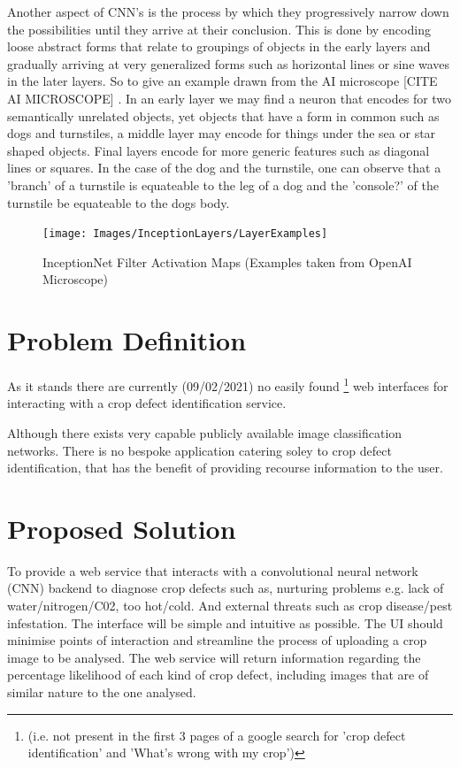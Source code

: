   \par
  Another aspect of CNN's is the process by which they progressively narrow down the possibilities until they arrive at their conclusion. This is done by encoding loose abstract forms that relate to groupings of objects in the early layers and gradually arriving at very generalized forms such as horizontal lines or sine waves in the later layers. So to give an example drawn from the AI microscope [CITE AI MICROSCOPE] . In an early layer  we may find a neuron that encodes for two semantically unrelated objects, yet objects that have a form in common such as dogs and turnstiles, a middle layer may encode for things under the sea or star shaped objects. Final layers encode for more generic features such as diagonal lines or squares. In the case of the dog and the turnstile, one can observe that a 'branch' of a turnstile is equateable to the leg of a dog and the 'console?' of the turnstile be equateable to the dogs body.
  \par

  \begin{landscape}
    \begin{figure}[H]
      \begin{center}
        \texttt{[image: Images/InceptionLayers/LayerExamples]}
        \caption{InceptionNet Filter Activation Maps (Examples taken from OpenAI Microscope)}
        \label{fig:inceptionNet_filter_activation}
      \end{center}
    \end{figure}
  \end{landscape}
  \par

  \newpage

\section{Problem Definition}
  As it stands there are currently (09/02/2021) no easily found \footnote[1]{(i.e. not present in the first 3 pages of a google search for 'crop defect identification' and 'What's wrong with my crop')} web interfaces for interacting with a crop defect identification service.
  \par
  Although there exists very capable publicly available image classification networks. \cite{Yandex} There is no bespoke application catering soley to crop defect identification, that has the benefit of providing recourse information to the user.

\section{Proposed Solution}
  To provide a web service that interacts with a convolutional neural network (CNN) backend to diagnose crop defects such as, nurturing problems e.g. lack of water/nitrogen/C02, too hot/cold. And external threats such as crop disease/pest infestation. The interface will be simple and intuitive as possible. The UI should minimise points of interaction and streamline the process of uploading a crop image to be analysed.
	The web service will return information regarding the percentage likelihood of each kind of crop defect, including images that are of similar nature to the one analysed.

